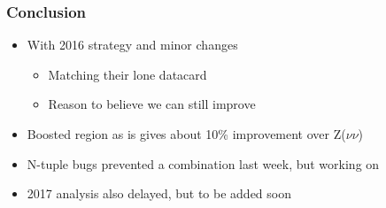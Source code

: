 \documentclass{beamer}
\newcommand{\beginbackup}{
  \newcounter{framenumbervorappendix}
  \setcounter{framenumbervorappendix}{\value{framenumber}}
}
\newcommand{\backupend}{
  \addtocounter{framenumbervorappendix}{-\value{framenumber}}
  \addtocounter{framenumber}{\value{framenumbervorappendix}}
}
\begin{document}
\begin{frame}
  \frametitle{Conclusion}
  \begin{itemize}
  \item With 2016 strategy and minor changes
    \begin{itemize}
    \item Matching their lone datacard
    \item Reason to believe we can still improve
    \end{itemize}
  \item Boosted region as is gives about 10\% improvement over Z($\nu\nu$)
  \item N-tuple bugs prevented a combination last week, but working on
  \item 2017 analysis also delayed, but to be added soon
  \end{itemize}
\end{frame}

%
%
%
%
\end{document}
